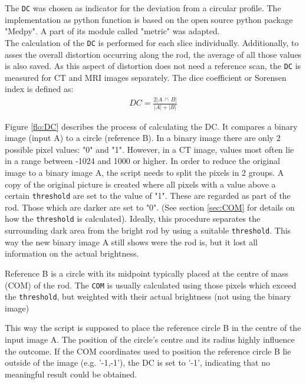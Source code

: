 The \texttt{DC} was chosen as indicator for the deviation from a circular profile.
The implementation as python function is based on the open source python package "Medpy". \cite{MedPy} A part of its module called "metric" was adapted. \cite{MedPy_dc-code}\\


The calculation of the \texttt{DC} is performed for each slice individually.
Additionally, to asses the overall distortion occurring along the rod, the average of all those values is also saved.
As this aspect of distortion does not need a reference scan, the \texttt{DC} is measured for CT and MRI images separately.
The dice coefficient or Sorensen index \cite{MedPy_dc-doc} is defined as:
\begin{align}
\label{eq:DC}
DC = \frac{2 |A \, \cap \, B|}{|A| + |B|}
\end{align}

Figure \ref{flo:DC} describes the process of calculating the DC.
It compares a binary image (input A) to a circle (reference B).
In a binary image there are only 2 possible pixel values: "0" and "1".
However, in a CT image, values most often lie in a range between -1024 and 1000 or higher.
In order to reduce the original image to a binary image A, the script needs to split the pixels in 2 groups.
A copy of the original picture is created where all pixels with a value above a certain  \texttt{threshold} are set to the value of "1".
These are regarded as part of the rod.
Those which are darker are set to "0".
(See section \ref{sec:COM} for details on how the \texttt{threshold} is calculated).
Ideally, this procedure separates the surrounding dark area from the bright rod by using a suitable \texttt{threshold}.
This way the new binary image A still shows were the rod is, but it lost all information on the actual brightness.

Reference B is a circle with its midpoint typically placed at the centre of mass (COM) of the rod.
The \texttt{COM} is usually calculated using those pixels which exceed the \texttt{threshold}, but weighted with their actual brightness (not using the binary image)

This way the script is supposed to place the reference circle B in the centre of the input image A.
The position of the circle's centre and its radius highly influence the outcome.
If the COM coordinates used to position the reference circle B lie outside of the image (e.g. '-1,-1'), the DC is set to '-1', indicating that no meaningful result could be obtained.

